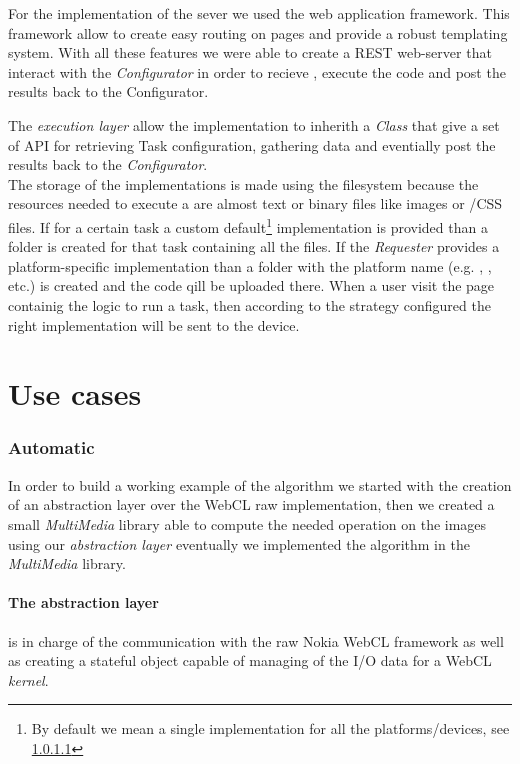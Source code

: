 For the implementation of the sever we used the  web
application framework. This framework allow to create easy routing on pages and
provide a robust templating system. With all these features we were able to
create a REST web-server that interact with the \emph{Configurator} in order to
recieve \utask{}, execute the code and post the results back to the Configurator.

The \emph{execution layer} allow the \utask{} implementation to inherith a
\js{} \emph{Class} that give a set of API for retrieving Task configuration,
gathering data and eventially post the \utask{} results back to the
\emph{Configurator}.\\

The storage of the \utask{} implementations is made using the filesystem because
the resources needed to execute a \utask{} are almost text or binary files like
images or \js{}/\ac{CSS} files. If for a certain task a custom default\footnote{
By default we mean a single implementation for all the platforms/devices, see
\ref{} } implementation is provided than a  folder is created for
that task containing all the files. If the \emph{Requester} provides a
platform-specific implementation than a folder with the platform name (e.g.
, , etc.) is created and the code qill be uploaded
there. When a user visit the page containig the logic to run a task, then according
to the strategy configured the right implementation will be sent to the device.


\section{Use cases}
\label{sec:implementation:use-cases}




\subsubsection{Automatic}
In order to build a working example of the algorithm we started with the creation
of an abstraction layer over the \ac{WebCL} raw implementation, then we created
a small \emph{MultiMedia} library able to compute the needed operation on the
images using our \emph{abstraction layer} eventually we implemented the algorithm
in the \emph{MultiMedia} library.

\paragraph{The abstraction layer} is in charge of the communication with the raw
Nokia WebCL framework as well as creating a stateful object capable of
managing of the I/O data for a WebCL \emph{kernel}.

